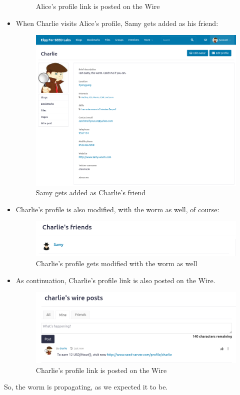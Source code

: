 \documentclass[12pt]{article}
\begin{document}
\begin{itemize}
\begin{figure}[H]
         \caption{Alice's profile link is posted on the Wire}
         \label{fig:ss12}
     \end{figure}
 \item When Charlie visits Alice's profile, Samy gets added as his friend:
     \begin{figure}[H]
         \centering
         \includegraphics[width=\textwidth]{Images/ss13.png}
         \caption{Samy gets added as Charlie's friend}
         \label{fig:ss13}
     \end{figure}
 \item Charlie's profile is also modified, with the worm as well, of course:
     \begin{figure}[H]
         \centering
         \includegraphics[width=\textwidth]{Images/ss14.png}
         \caption{Charlie's profile gets modified with the worm as well}
         \label{fig:ss14}
     \end{figure}
 \item As continuation, Charlie's profile link is also posted on the Wire.
     \begin{figure}[H]
         \centering
         \includegraphics[width=\textwidth]{Images/ss15.png}
         \caption{Charlie's profile link is posted on the Wire}
         \label{fig:ss15}
     \end{figure}
\end{itemize}

So, the worm is propagating, as we expected it to be.
\end{document}
